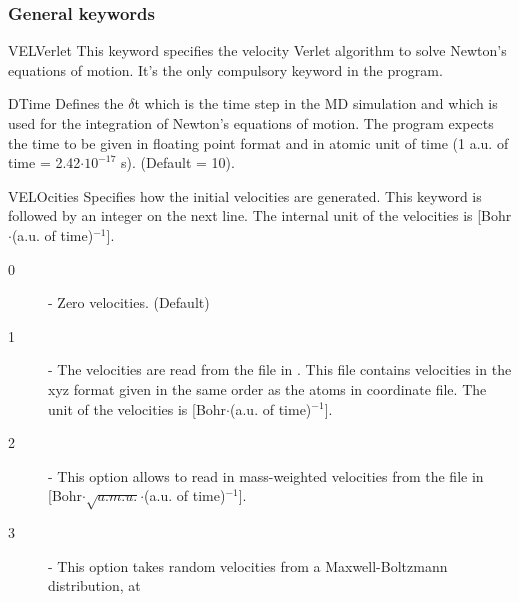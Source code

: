 \subsubsection{General keywords}
\begin{keywordlist}
\item[VELVerlet]
This keyword specifies the velocity Verlet algorithm \cite{swope:637} to solve Newton's
equations of motion. It's the only compulsory keyword in the program.
\item[DTime]
Defines the $\delta$t which is the time step in the MD simulation and which is
used for the integration of Newton's equations of motion.
The program expects the time to be given in floating point
format and in atomic unit of time (1 a.u. of time = 2.42$\cdot$$10^{-17}$ s). (Default = 10).
\item[VELOcities]
Specifies how the initial velocities are generated.
This keyword is followed by an integer on the next line. The internal
unit of the velocities is [Bohr$\cdot$(a.u. of time)$^{-1}$].
\begin{description}
\item[{\mdseries{ }0}] - Zero velocities. (Default)
\item[{\mdseries{ }1}] - The velocities are read from the file 
in . This file contains velocities in the xyz format given in the same
order as the atoms in coordinate file. The unit of the velocities is [Bohr$\cdot$(a.u. of time)$^{-1}$].
\item[{\mdseries{ }2}] - This option allows to read in mass-weighted velocities from the
file  in [Bohr$\cdot$$\sqrt{a.m.u.}$$\cdot$(a.u. of time)$^{-1}$].
\item[{\mdseries{ }3}] - This option takes random velocities from a Maxwell-Boltzmann distribution, at

\end{description}$$
\end{keywordlist}
